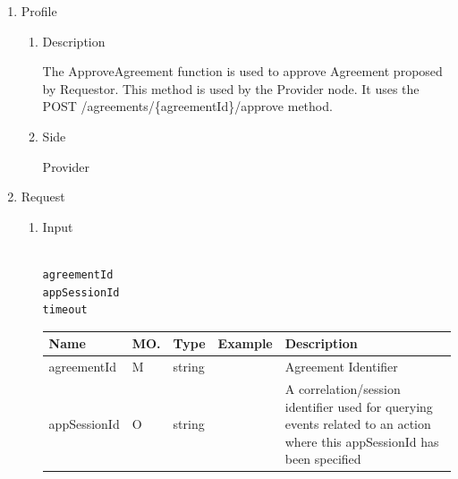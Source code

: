 \begin{enumerate}

\item Profile

\begin{enumerate}

\item Description

The ApproveAgreement function is used to approve Agreement proposed by Requestor. This method is used by the Provider node. 
It uses the POST /agreements/\{agreementId\}/approve method.

\item Side

Provider

\end{enumerate}

\item Request

\begin{enumerate}

\item Input

\begin{tcolorbox}[boxrule=0pt, frame empty]
\begin{verbatim}

agreementId
appSessionId
timeout

\end{verbatim}
\end{tcolorbox}


\begin{table}[H]
\footnotesize

\begin{center}
\begin{tabular}{|p{3cm}|l|p{3cm}|p{3cm}|p{4cm}|} 
\hline
\rowcolor{lightgray}	Name	& MO.	& Type	& Example & 	Description \\
\hline

agreementId		& M & 	string				&		& 	Agreement Identifier \\
\hline

appSessionId	& O	& 	string				&		&	A correlation/session identifier used for querying events related to an action where this appSessionId has been specified 	\\ 
\hline


\end{tabular}
\end{center}
\end{table}
\end{enumerate}
\end{enumerate}
